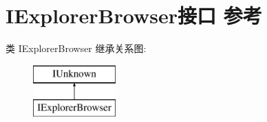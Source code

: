 \hypertarget{interface_i_explorer_browser}{}\section{I\+Explorer\+Browser接口 参考}
\label{interface_i_explorer_browser}
类 I\+Explorer\+Browser 继承关系图\+:\begin{figure}[H]
\begin{center}
\leavevmode
\includegraphics[height=2.000000cm]{interface_i_explorer_browser}
\end{center}
\end{figure}
